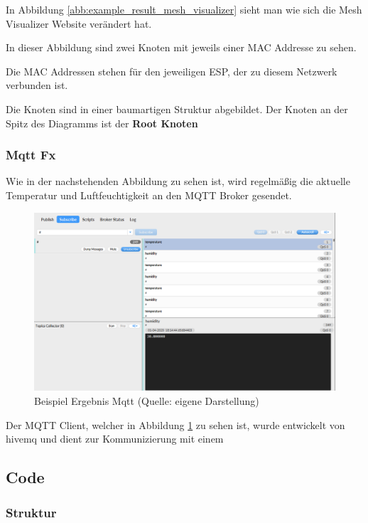 In Abbildung \ref{abb:example_result_mesh_visualizer} sieht man wie sich die Mesh Visualizer Website verändert hat.

In dieser Abbildung sind zwei Knoten mit jeweils einer MAC Addresse zu sehen.

Die MAC Addressen stehen für den jeweiligen ESP, der zu diesem Netzwerk verbunden ist.

Die Knoten sind in einer baumartigen Struktur abgebildet. Der Knoten an der Spitz des Diagramms ist der \textbf{Root Knoten}

\subsubsection{Mqtt Fx}

Wie in der nachstehenden Abbildung zu sehen ist, wird regelmäßig die aktuelle Temperatur und Luftfeuchtigkeit an den MQTT Broker gesendet.

\begin{figure}[H]
    \begin{center}
        \includegraphics[scale=0.5]{images/example_result_mqtt.png}
        \caption{Beispiel Ergebnis Mqtt (Quelle: eigene Darstellung)}
        \label{abb:example_result_mqtt}
    \end{center}

\end{figure}

Der MQTT Client, welcher in Abbildung \ref{abb:example_result_mqtt} zu sehen ist, wurde entwickelt von hivemq und dient zur Kommunizierung mit einem 

\subsection{Code}\label{sec:code}
\subsubsection{Struktur}


